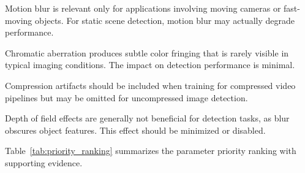 Motion blur is relevant only for applications involving moving cameras or fast-moving objects. For static scene detection, motion blur may actually degrade performance.

Chromatic aberration produces subtle color fringing that is rarely visible in typical imaging conditions. The impact on detection performance is minimal.

Compression artifacts should be included when training for compressed video pipelines but may be omitted for uncompressed image detection.

Depth of field effects are generally not beneficial for detection tasks, as blur obscures object features. This effect should be minimized or disabled.

Table~\ref{tab:priority_ranking} summarizes the parameter priority ranking with supporting evidence.

